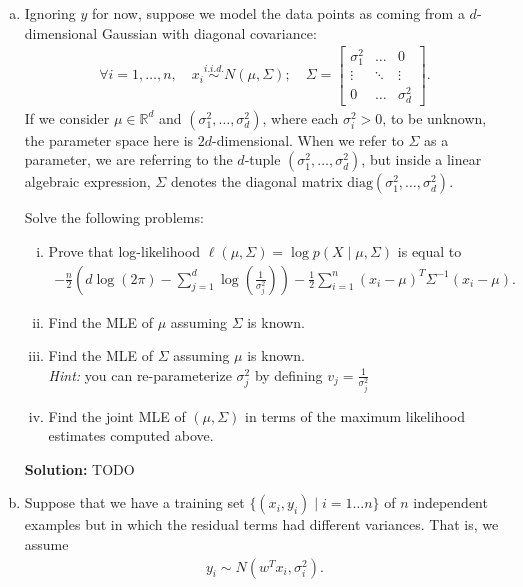 \documentclass{article}
\newenvironment{solution}{\color{blue} \smallskip \textbf{Solution:}}{}
\begin{document}
\begin{enumerate}[(a)]
    \item %
    Ignoring $y$ for now, suppose we model the data points as coming from a $d$-dimensional Gaussian with diagonal covariance:
    \begin{align*}
       \forall i = 1, \ldots, n, \quad x_i \stackrel{i.i.d.}{\sim} N(\mu, \Sigma); \quad  \Sigma = \begin{bmatrix} \sigma_1^2 & \ldots & 0 \\ 
        \vdots & \ddots & \vdots \\ 0 & \ldots & \sigma_d^2\end{bmatrix}.
    \end{align*}
    If we consider $\mu\in\mathbb R^d$ and $(\sigma_1^2,\ldots, \sigma_d^2)$, where each $\sigma_i^2 > 0$, to be unknown, the parameter space here is $2d$-dimensional. When we refer to $\Sigma$ as a parameter, we are referring to the $d$-tuple $(\sigma_1^2,\ldots, \sigma_d^2)$, but inside a linear algebraic expression, $\Sigma$ denotes the diagonal matrix $\mathrm{diag}(\sigma_1^2,\ldots,\sigma_d^2)$.

    Solve the following problems:
    \begin{enumerate}[(i)]
        \item Prove that log-likelihood $\ell(\mu, \Sigma) = \log p(X \mid \mu, \Sigma)$ is equal to
        \begin{align*}
            -\frac{n}{2}\left(d \log (2\pi) - \sum_{j = 1}^{d} \log\left(\frac{1}{\sigma_{j}^{2}}\right)\right) - \frac{1}{2} \sum_{i = 1}^{n}(x_{i} - \mu)^{T}\Sigma^{-1}(x_{i} - \mu).
        \end{align*}

        \item Find the MLE of $\mu$ assuming $\Sigma$ is known.
        \item Find the MLE of $\Sigma$ assuming $\mu$ is known. \\
        \textit{Hint:} you can re-parameterize $\sigma_j^2$ by defining $v_j=\frac{1}{\sigma_j^2}$
        \item Find the joint MLE of $(\mu, \Sigma)$ in terms of the maximum likelihood estimates computed above.
    \end{enumerate}
    
    \begin{solution}
        TODO
    \end{solution}

    \newpage
    \item %
    Suppose that we have a training set $\{(x_{i}, y_{i}) \mid i = 1 \ldots n\}$ of $n$ independent examples but in which the residual terms had different variances. That is, we assume
    \begin{align*}
        y_{i} \sim N(w^{T}x_{i}, \sigma_{i}^{2}).
    \end{align*}
    

\end{enumerate}
\end{document}
